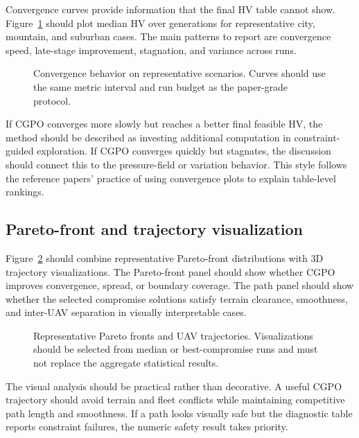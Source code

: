 Convergence curves provide information that the final HV table cannot show. Figure~\ref{fig:convergence} should plot median HV over generations for representative city, mountain, and suburban cases. The main patterns to report are convergence speed, late-stage improvement, stagnation, and variance across runs.

\begin{figure}[t]
\centering
{}
\caption{Convergence behavior on representative scenarios. Curves should use the same metric interval and run budget as the paper-grade protocol.}
\label{fig:convergence}
\end{figure}

If CGPO converges more slowly but reaches a better final feasible HV, the method should be described as investing additional computation in constraint-guided exploration. If CGPO converges quickly but stagnates, the discussion should connect this to the pressure-field or variation behavior. This style follows the reference papers' practice of using convergence plots to explain table-level rankings.

\subsection{Pareto-front and trajectory visualization}
\label{subsec:pf-path-visualization}

Figure~\ref{fig:pf-path} should combine representative Pareto-front distributions with 3D trajectory visualizations. The Pareto-front panel should show whether CGPO improves convergence, spread, or boundary coverage. The path panel should show whether the selected compromise solutions satisfy terrain clearance, smoothness, and inter-UAV separation in visually interpretable cases.

\begin{figure}[t]
\centering
{}
\caption{Representative Pareto fronts and UAV trajectories. Visualizations should be selected from median or best-compromise runs and must not replace the aggregate statistical results.}
\label{fig:pf-path}
\end{figure}

The visual analysis should be practical rather than decorative. A useful CGPO trajectory should avoid terrain and fleet conflicts while maintaining competitive path length and smoothness. If a path looks visually safe but the diagnostic table reports constraint failures, the numeric safety result takes priority.

